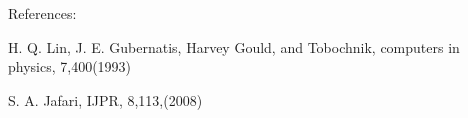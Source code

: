 References\+:


\begin{DoxyEnumerate}
\item H. Q. Lin, J. E. Gubernatis, Harvey Gould, and Tobochnik, computers in physics, 7,400(1993) 
\item S. A. Jafari, I\+J\+PR, 8,113,(2008)  
\end{DoxyEnumerate}